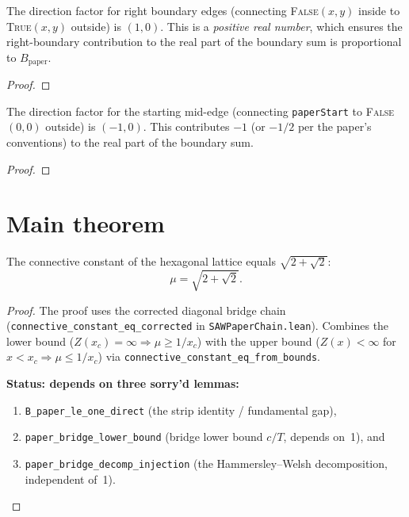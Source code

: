 \begin{lemma}\label{lem:right_boundary_dir}
\leanok
{}
  The direction factor for right boundary edges (connecting
  \textsc{False}$(x,y)$ inside to \textsc{True}$(x,y)$ outside) is $(1,0)$.
  This is a \emph{positive real number}, which ensures the right-boundary
  contribution to the real part of the boundary sum is proportional to $B_{\text{paper}}$.
\end{lemma}
\begin{proof}
\leanok
\end{proof}

\begin{lemma}\label{lem:starting_dir}
\leanok
{}
  The direction factor for the starting mid-edge (connecting
  \texttt{paperStart} to \textsc{False}$(0,0)$ outside) is $(-1,0)$.
  This contributes $-1$ (or $-1/2$ per the paper's conventions) to the
  real part of the boundary sum.
\end{lemma}
\begin{proof}
\leanok
\end{proof}


\chapter{Main theorem}\label{chap:main}

\begin{theorem}\label{thm:main}
  The connective constant of the hexagonal lattice equals $\sqrt{2+\sqrt{2}}$:
  \[ \mu = \sqrt{2+\sqrt{2}}. \]
\end{theorem}
\begin{proof}
  The proof uses the corrected diagonal bridge chain
  (\texttt{connective\_constant\_eq\_corrected} in \texttt{SAWPaperChain.lean}).
  Combines the lower bound ($Z(x_c) = \infty \Rightarrow \mu \geq 1/x_c$)
  with the upper bound ($Z(x) < \infty$ for $x < x_c \Rightarrow \mu \leq 1/x_c$)
  via \texttt{connective\_constant\_eq\_from\_bounds}.

  \textbf{Status: depends on three sorry'd lemmas:}
  \begin{enumerate}
  \item \texttt{B\_paper\_le\_one\_direct} (the strip identity / fundamental gap),
  \item \texttt{paper\_bridge\_lower\_bound}
        (bridge lower bound $c/T$, depends on~1), and
  \item \texttt{paper\_bridge\_decomp\_injection}
        (the Hammersley--Welsh decomposition, independent of~1).
  \end{enumerate}
\end{proof}

